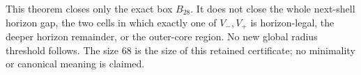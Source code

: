 \begin{remark}
\label{rem:p12-round28-scope}
This theorem closes only the exact box \(B_{28}\).  It does not close the
whole next-shell horizon gap, the two cells in which exactly one of
\(V_-,V_+\) is horizon-legal, the deeper horizon remainder, or the
outer-core region.  No new global radius threshold follows.  The size 68 is
the size of this retained certificate; no minimality or canonical meaning is
claimed.
\end{remark}
